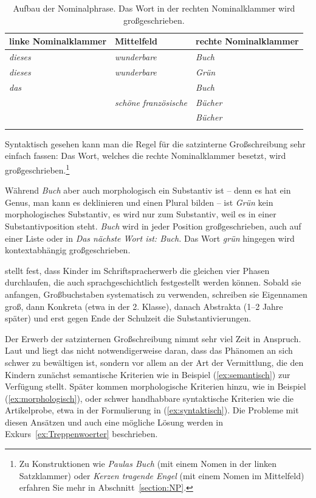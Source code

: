 \begin{table}
    \centering
    \caption{\label{StrukturNP}Aufbau der Nominalphrase. Das Wort in der rechten Nominalklammer wird großgeschrieben.}
\begin{tabular}{lll}\lsptoprule
linke Nominalklammer & Mittelfeld & rechte Nominalklammer\\\midrule
\textit{dieses} & \textit{wunderbare} & \textit{Buch}\\
\textit{dieses} & \textit{wunderbare} & \textit{Grün}\\
\textit{das} & & \textit{Buch}\\
& \textit{schöne französische} & \textit{Bücher}\\
&&\textit{Bücher}\\\lspbottomrule
\end{tabular}
\end{table}

Syntaktisch gesehen kann man die Regel für die satzinterne Großschreibung sehr einfach fassen: Das Wort, welches die rechte Nominalklammer besetzt, wird großgeschrieben.\footnote{Zu Konstruktionen wie \textit{Paulas Buch} (mit einem Nomen in der linken Satzklammer) oder \textit{Kerzen tragende Engel} (mit einem Nomen im Mittelfeld) erfahren Sie mehr in Abschnitt~\ref{section:NP}.}

\largerpage[-2]
Während \textit{Buch} aber auch morphologisch ein Substantiv ist -- denn es hat ein Genus, man kann es deklinieren und einen Plural bilden -- ist \textit{Grün} kein morphologisches Substantiv, es wird nur zum Substantiv, weil es in einer Substantivposition steht. \textit{Buch} wird in jeder Position großgeschrieben, \zB auch auf einer Liste oder in \textit{Das nächste Wort ist: Buch.} Das Wort \textit{grün} hingegen wird kontextabhängig großgeschrieben.

\citet[157]{Bredel2006} stellt fest, dass Kinder im Schriftspracherwerb die gleichen vier Phasen durchlaufen, die auch sprachgeschichtlich festgestellt werden können. Sobald sie anfangen, Großbuchstaben systematisch zu verwenden, schreiben sie Eigennamen groß, dann Konkreta (etwa in der 2. Klasse), danach Abstrakta (1--2 Jahre später) und erst gegen Ende der Schulzeit die Substantivierungen.

Der Erwerb der satzinternen Großschreibung nimmt sehr viel Zeit in Anspruch. Laut \citet{Bredel2006} und \citet{GuentherNuenke2005} liegt das nicht notwendigerweise daran, dass das Phänomen an sich schwer zu bewältigen ist, sondern vor allem an der Art der Vermittlung, die den Kindern zunächst semantische Kriterien wie in Beispiel (\ref{ex:semantisch}) zur Verfügung stellt. Später kommen morphologische Kriterien hinzu, wie in Beispiel (\ref{ex:morphologisch}), oder schwer handhabbare syntaktische Kriterien wie die Artikelprobe, etwa in der Formulierung in (\ref{ex:syntaktisch}). Die Probleme mit diesen Ansätzen und auch eine mögliche Lösung werden in Exkurs~\ref{ex:Treppenwoerter} beschrieben.

